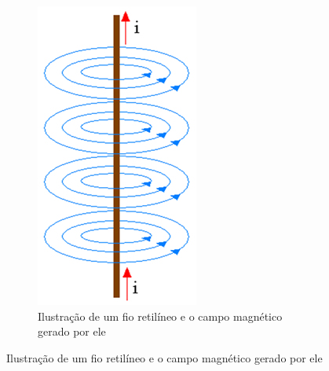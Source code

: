 \documentclass[12pt]{extarticle}
\newcommand{\<}{\langle}
\renewcommand{\>}{\rangle}
\theoremstyle{definition}
\begin{document}
\begin{figure}[H]
     \centering
     \begin{subfigure}[b]{0.3\textwidth}
     \centering
         \includegraphics[width=\textwidth]{fio.jpg}
         \caption{Ilustração de um fio retilíneo e o campo magnético gerado por ele}
         \label{fig:fio}
     \end{subfigure}

\end{figure}
\end{document}

